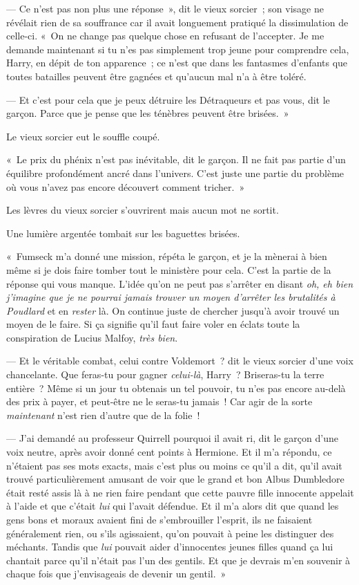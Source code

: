 --- Ce n'est pas non plus une réponse~», dit le vieux sorcier~; son visage ne révélait rien de sa souffrance car il avait longuement pratiqué la dissimulation de celle-ci.
«~On ne change pas quelque chose en refusant de l'accepter.
Je me demande maintenant si tu n'es pas simplement trop jeune pour comprendre cela, Harry, en dépit de ton apparence~; ce n'est que dans les fantasmes d'enfants que toutes batailles peuvent être gagnées et qu'aucun mal n'a à être toléré.

--- Et c'est pour cela que je peux détruire les Détraqueurs et pas vous, dit le garçon.
Parce que je pense que les ténèbres peuvent être brisées.~»

Le vieux sorcier eut le souffle coupé.

«~Le prix du phénix n'est pas inévitable, dit le garçon.
Il ne fait pas partie d'un équilibre profondément ancré dans l'univers.
C'est juste une partie du problème où vous n'avez pas encore découvert comment tricher.~»

Les lèvres du vieux sorcier s'ouvrirent mais aucun mot ne sortit.

Une lumière argentée tombait sur les baguettes brisées.

«~Fumseck m'a donné une mission, répéta le garçon, et je la mènerai à bien même si je dois faire tomber tout le ministère pour cela.
C'est la partie de la réponse qui vous manque.
L'idée qu'on ne peut pas s'arrêter en disant \emph{oh, eh bien j'imagine que je ne pourrai jamais trouver un moyen d'arrêter les brutalités à Poudlard} et en \emph{rester} là.
On continue juste de chercher jusqu'à avoir trouvé un moyen de le faire.
Si ça signifie qu'il faut faire voler en éclats toute la conspiration de Lucius Malfoy, \emph{très bien}.

--- Et le véritable combat, celui contre Voldemort~? dit le vieux sorcier d'une voix chancelante.
Que feras-tu pour gagner \emph{celui-là}, Harry~?
Briseras-tu la terre entière~?
Même si un jour tu obtenais un tel pouvoir, tu n'es pas encore au-delà des prix à payer, et peut-être ne le seras-tu jamais~!
Car agir de la sorte \emph{maintenant} n'est rien d'autre que de la folie~!

--- J'ai demandé au professeur Quirrell pourquoi il avait ri, dit le garçon d'une voix neutre, après avoir donné cent points à Hermione.
Et il m'a répondu, ce n'étaient pas ses mots exacts, mais c'est plus ou moins ce qu'il a dit, qu'il avait trouvé particulièrement amusant de voir que le grand et bon Albus Dumbledore était resté assis là à ne rien faire pendant que cette pauvre fille innocente appelait à l'aide et que c'était \emph{lui} qui l'avait défendue.
Et il m'a alors dit que quand les gens bons et moraux avaient fini de s'embrouiller l'esprit, ils ne faisaient généralement rien, ou s'ils agissaient, qu'on pouvait à peine les distinguer des méchants.
Tandis que \emph{lui} pouvait aider d'innocentes jeunes filles quand ça lui chantait parce qu'il n'était pas l'un des gentils.
Et que je devrais m'en souvenir à chaque fois que j'envisageais de devenir un gentil.~»

